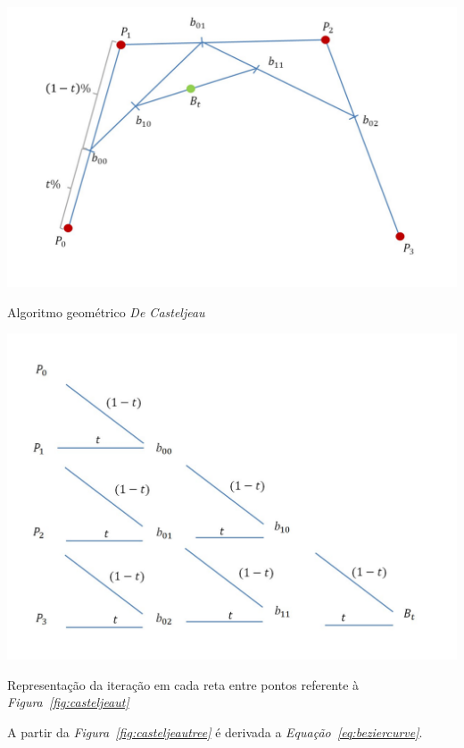 \begin{center}	
 	\includegraphics[width=\textwidth,height=\textheight,keepaspectratio]{resources/casteljou.png}
 	\captionsetup{type=figure, width=0.8\linewidth}
	\caption{Algoritmo geométrico \emph{De Casteljeau}}
\label{fig:casteljeaut} 
\end{center}


\begin{center}	
 	\includegraphics[width=\textwidth,height=\textheight,keepaspectratio]{resources/casteljeau2.png}
 	\captionsetup{type=figure, width=0.8\linewidth}
	\caption{Representação da iteração em cada reta entre pontos referente
		à \emph{Figura~\ref{fig:casteljeaut}}}
\label{fig:casteljeautree} 
\end{center}

A partir da \emph{Figura~\ref{fig:casteljeautree}} é derivada
a \emph{Equação~\ref{eq:beziercurve}}.


